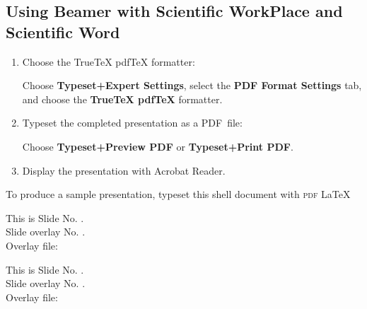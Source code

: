 \documentclass{article}
\begin{document}
\begin{slide}%

\subsection{Using Beamer with Scientific WorkPlace and Scientific Word}


\begin{enumerate}
\item Choose the TrueTeX pdfTeX formatter:

Choose \textbf{Typeset+Expert Settings}, select the \textbf{PDF Format
Settings} tab, and choose the \textbf{TrueTeX pdfTeX} formatter.

\item Typeset the completed presentation as a PDF\ file:

Choose \textbf{Typeset+Preview PDF} or \textbf{Typeset+Print PDF}.

\item Display the presentation with Acrobat Reader.
\end{enumerate}

To produce a sample presentation, typeset this shell document with \textsc{%
pdf}%
\LaTeX{}

\end{slide}%

\begin{slide}\Huge\color{orange}\centering
This is  Slide No. \theslide.\\
\color{blue}\large Slide overlay No. \theslideoverlay.\\
\color{red} Overlay file: \makeatletter\@overlay\makeatother
\end{slide}

\begin{slide}\Huge\color{orange}\centering
This is  Slide No. \theslide.\\
\color{blue}\large Slide overlay No. \theslideoverlay.\\
\color{red} Overlay file: \makeatletter\@overlay\makeatother
\end{slide}
\end{document}
